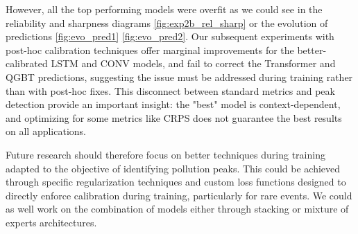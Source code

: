 \documentclass[12pt,a4paper]{book}
\begin{document}
However, all the top performing models were overfit as we could see in the reliability and sharpness diagrams \ref{fig:exp2b_rel_sharp} or the evolution of predictions \ref{fig:evo_pred1} \ref{fig:evo_pred2}. Our subsequent experiments with post-hoc calibration techniques offer marginal improvements for the better-calibrated LSTM and CONV models, and fail to correct the Transformer and QGBT predictions, suggesting the issue must be addressed during training rather than with post-hoc fixes. This disconnect between standard metrics and peak detection provide an important insight: the "best" model is context-dependent, and optimizing for some metrics like CRPS does not guarantee the best results on all applications. 

Future research should therefore focus on better techniques during training adapted to the objective of identifying pollution peaks. This could be achieved through specific regularization techniques and custom loss functions designed to directly enforce calibration during training, particularly for rare events. We could as well work on the combination of models either through stacking or mixture of experts architectures. 

\end{document}
